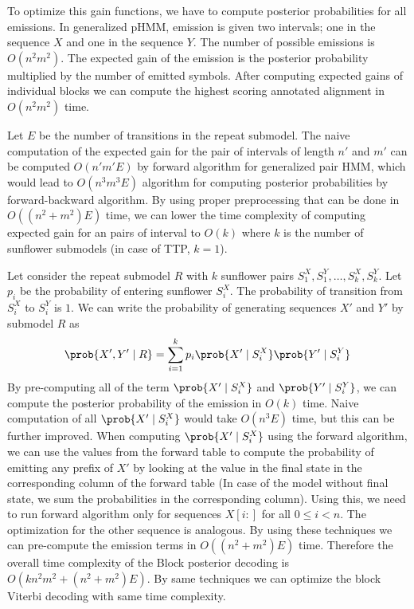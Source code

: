 To optimize this gain functions, we have to compute posterior probabilities for
all emissions. In generalized pHMM, emission is given two intervals; one in the
sequence $X$ and one in the sequence $Y$. The number of possible emissions is
$O(n^2m^2)$. The expected gain of the emission is the posterior probability
multiplied by the number of emitted symbols. After computing expected gains of
individual blocks we can compute the highest scoring annotated alignment in
$O(n^2m^2)$ time.

Let $E$ be the number of transitions in the repeat submodel. The naive
computation of the expected gain for the pair of intervals of length $n'$ and
$m'$ can be computed $O(n'm'E)$ by forward algorithm for generalized pair HMM,
which would lead to $O(n^3m^3E)$ algorithm for computing posterior
probabilities by forward-backward algorithm. By using proper preprocessing that
can be done in $O((n^2+m^2)E)$ time, we can lower the time complexity of
computing expected gain for an pairs of interval to $O(k)$ where $k$ is the
number of sunflower submodels (in case of TTP, $k=1$).

Let consider the repeat submodel $R$ with $k$ sunflower pairs $S^X_1, S^Y_1,
\dots, S^X_k, S^Y_k$. Let $p_i$ be the probability of entering sunflower
$S^X_i$.  The probability of transition from $S^X_i$ to $S^Y_i$ is $1$. We can
write the probability of generating sequences $X'$ and $Y'$ by submodel $R$ as
\begin{equation}
\prob{X', Y'\mid R} = \sum_{i=1}^k p_i\prob{X'\mid S^X_i}\prob{Y'\mid S^Y_i}
\end{equation}
By pre-computing all of the term $\prob{X'\mid S^X_i}$ and $\prob{Y'\mid
S^Y_i}$, we can compute the posterior probability of the emission in $O(k)$
time. Naive computation of all $\prob{X'\mid S^X_i}$ would take $O(n^3E)$ time,
but this can be further improved. When computing $\prob{X'\mid S^X_i}$ using
the forward algorithm, we can use the values from the forward table to compute
the probability of emitting any prefix of $X'$ by looking at the value in the
final state in the corresponding column of the forward table (In case of the
model without final state, we sum the probabilities in the corresponding
column). Using this, we need to run forward algorithm only for sequences
$X[i:]$ for all $0\leq i< n$. The optimization for the other sequence is
analogous. By using these techniques we can pre-compute the emission terms in
$O((n^2+m^2)E)$ time. Therefore the overall time complexity of the Block
posterior decoding is $O(kn^2m^2 + (n^2+m^2)E)$. By same techniques we
can optimize the block Viterbi decoding with same time complexity.

